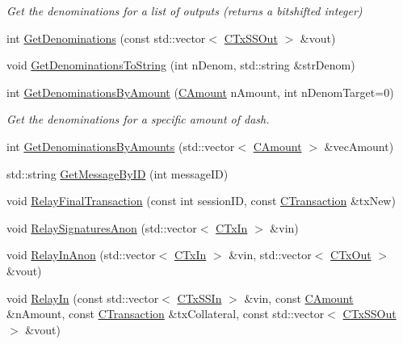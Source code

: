 \begin{DoxyCompactItemize}
\begin{DoxyCompactList}\small\item\em Get the denominations for a list of outputs (returns a bitshifted integer) \end{DoxyCompactList}\item 
int \hyperlink{class_c_sandstorm_pool_a109d7f04c53b6c43d8fa855b0a9c2ec2}{Get\+Denominations} (const std\+::vector$<$ \hyperlink{class_c_tx_s_s_out}{C\+Tx\+S\+S\+Out} $>$ \&vout)
\item 
void \hyperlink{class_c_sandstorm_pool_af792e1a4f37918317d869b3b73467af7}{Get\+Denominations\+To\+String} (int n\+Denom, std\+::string \&str\+Denom)
\item 
int \hyperlink{class_c_sandstorm_pool_af7d1f51900ef204ed612fa27096181af}{Get\+Denominations\+By\+Amount} (\hyperlink{amount_8h_a4eaf3a5239714d8c45b851527f7cb564}{C\+Amount} n\+Amount, int n\+Denom\+Target=0)
\begin{DoxyCompactList}\small\item\em Get the denominations for a specific amount of dash. \end{DoxyCompactList}\item 
int \hyperlink{class_c_sandstorm_pool_a1557c65382d02a17fed149290797d960}{Get\+Denominations\+By\+Amounts} (std\+::vector$<$ \hyperlink{amount_8h_a4eaf3a5239714d8c45b851527f7cb564}{C\+Amount} $>$ \&vec\+Amount)
\item 
std\+::string \hyperlink{class_c_sandstorm_pool_a1b34d9c712a8fc4c795d3294209597af}{Get\+Message\+By\+I\+D} (int message\+I\+D)
\item 
void \hyperlink{class_c_sandstorm_pool_aa07e994eb333486b5aa63733ba3b5ac5}{Relay\+Final\+Transaction} (const int session\+I\+D, const \hyperlink{class_c_transaction}{C\+Transaction} \&tx\+New)
\item 
void \hyperlink{class_c_sandstorm_pool_a1bcf989c2b8c5794a19e59ab5b1285bf}{Relay\+Signatures\+Anon} (std\+::vector$<$ \hyperlink{class_c_tx_in}{C\+Tx\+In} $>$ \&vin)
\item 
void \hyperlink{class_c_sandstorm_pool_a9750eb5b306cb18e1c3dfd3a583a3e5e}{Relay\+In\+Anon} (std\+::vector$<$ \hyperlink{class_c_tx_in}{C\+Tx\+In} $>$ \&vin, std\+::vector$<$ \hyperlink{class_c_tx_out}{C\+Tx\+Out} $>$ \&vout)
\item 
void \hyperlink{class_c_sandstorm_pool_ade2ee9d0faa6598f90f672302d17eba8}{Relay\+In} (const std\+::vector$<$ \hyperlink{class_c_tx_s_s_in}{C\+Tx\+S\+S\+In} $>$ \&vin, const \hyperlink{amount_8h_a4eaf3a5239714d8c45b851527f7cb564}{C\+Amount} \&n\+Amount, const \hyperlink{class_c_transaction}{C\+Transaction} \&tx\+Collateral, const std\+::vector$<$ \hyperlink{class_c_tx_s_s_out}{C\+Tx\+S\+S\+Out} $>$ \&vout)

\end{DoxyCompactItemize}
